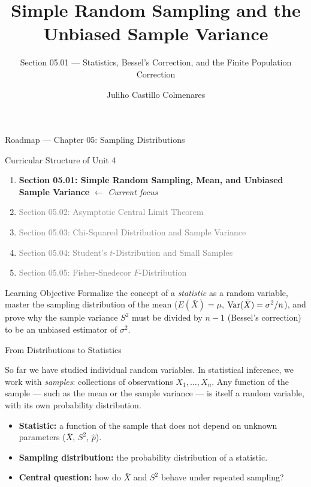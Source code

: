 \documentclass[aspectratio=169,xcolor={dvipsnames,table}]{beamer}
\title{Simple Random Sampling and the Unbiased Sample Variance}
\subtitle{Section 05.01 --- Statistics, Bessel's Correction, and the Finite Population Correction}
\author[J. Castillo Colmenares]{Juliho Castillo Colmenares}
\institute[Tec de Monterrey]{Tecnologico de Monterrey}
\date{\vspace{-1.5cm}}
\begin{document}
\begin{frame}[plain]
	\titlepage
\end{frame}

\begin{frame}{Roadmap --- Chapter 05: Sampling Distributions}
	\vspace{-0.15cm}
	\begin{block}{Curricular Structure of Unit 4}
		\footnotesize
		\begin{enumerate}\itemsep=0.03cm
			\item \textbf{\textcolor{TecRojo}{Section 05.01: Simple Random Sampling, Mean, and Unbiased Sample Variance}} $\leftarrow$ \emph{Current focus}
			\item \textcolor{gray}{Section 05.02: Asymptotic Central Limit Theorem}
			\item \textcolor{gray}{Section 05.03: Chi-Squared Distribution and Sample Variance}
			\item \textcolor{gray}{Section 05.04: Student's $t$-Distribution and Small Samples}
			\item \textcolor{gray}{Section 05.05: Fisher-Snedecor $F$-Distribution}
		\end{enumerate}
	\end{block}
	\vspace{-0.2cm}
	\begin{alertblock}{Learning Objective}
		\scriptsize
		Formalize the concept of a \emph{statistic} as a random variable, master the sampling distribution of the mean ($E(\bar{X})=\mu$, $\operatorname{Var}(\bar{X})=\sigma^2/n$), and prove why the sample variance $S^2$ must be divided by $n-1$ (Bessel's correction) to be an unbiased estimator of $\sigma^2$.
	\end{alertblock}
\end{frame}

\begin{frame}{From Distributions to Statistics}
	\footnotesize
	\begin{motivacion}
		So far we have studied individual random variables. In statistical inference, we work with \emph{samples}: collections of observations $X_1, \ldots, X_n$. Any function of the sample --- such as the mean or the sample variance --- is itself a random variable, with its own probability distribution.
	\end{motivacion}
	\vspace{0.15cm}
	\pause
	\begin{itemize}\itemsep=0.1cm
		\item \textbf{Statistic:} a function of the sample that does not depend on unknown parameters ($\bar{X}$, $S^2$, $\hat{p}$). \pause
		\item \textbf{Sampling distribution:} the probability distribution of a statistic. \pause
		\item \textbf{Central question:} how do $\bar{X}$ and $S^2$ behave under repeated sampling?
	\end{itemize}
\end{frame}
\end{document}
